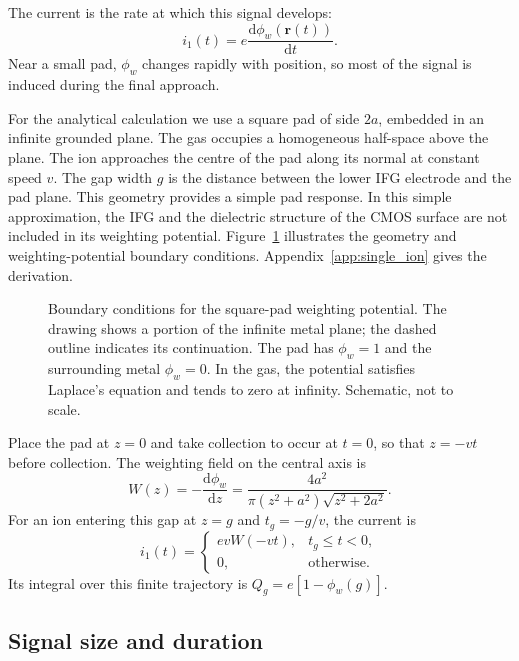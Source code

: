 \documentclass[11pt,a4paper]{article}
\newcommand{\dd}{\mathrm{d}}
\begin{document}
The current is the rate at which this signal develops:
\begin{equation}
 i_1(t)=e\frac{\dd\phi_w(\mathbf r(t))}{\dd t}.
 \label{eq:single_ramo}
\end{equation}
Near a small pad, $\phi_w$ changes rapidly with position, so most of the signal is induced during the final approach. 

For the analytical calculation we use a square pad of side $2a$, embedded in an infinite grounded plane. The gas occupies a homogeneous half-space above the plane. The ion approaches the centre of the pad along its normal at constant speed $v$. The gap width $g$ is the distance between the lower IFG electrode and the pad plane. This geometry provides a simple pad response. In this simple approximation, the IFG and the dielectric structure of the CMOS surface are not included in its weighting potential. Figure~\ref{fig:weighting_boundary} illustrates the geometry and weighting-potential boundary conditions. Appendix~\ref{app:single_ion} gives the derivation.

\begin{figure}[!htbp]
 \centering
 
 \caption{Boundary conditions for the square-pad weighting potential.
 The drawing shows a portion of the infinite metal plane; the dashed outline
 indicates its continuation. The pad has $\phi_w=1$ and the surrounding metal
 $\phi_w=0$. In the gas, the potential satisfies Laplace's equation and tends
 to zero at infinity. Schematic, not to scale.}
 \label{fig:weighting_boundary}
\end{figure}

Place the pad at $z=0$ and take collection to occur at $t=0$, so that $z=-vt$ before collection. The weighting field on the central axis is
%
\begin{equation}
 W(z)=-\frac{\dd\phi_w}{\dd z}
 =\frac{4a^2}{\pi(z^2+a^2)\sqrt{z^2+2a^2}}.
 \label{eq:single_weight}
\end{equation}
%
For an ion entering this gap at $z=g$ and $t_g=-g/v$, the current is
%
\begin{equation}
 i_1(t)=
 \begin{cases}
 evW(-vt),&t_g\leq t<0,\\
 0,&\text{otherwise}.
 \end{cases}
 \label{eq:single_current}
\end{equation}
%
Its integral over this finite trajectory is $Q_g=e[1-\phi_w(g)]$.

\subsection{Signal size and duration}
\end{document}
